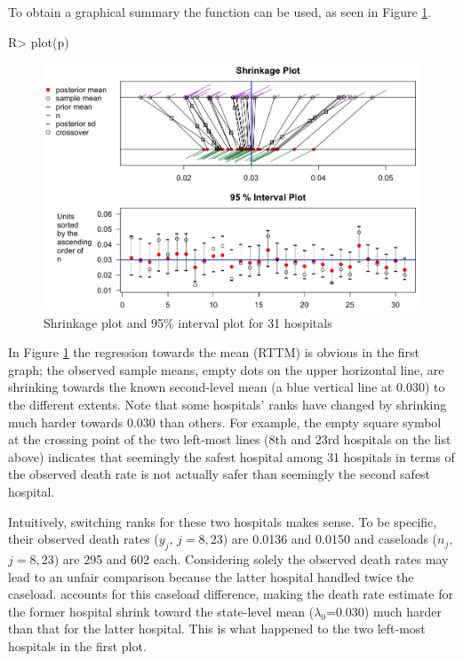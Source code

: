 \documentclass[article]{jss}
\begin{document}
To obtain a graphical summary the function  can be used, as seen in Figure \ref{fig:hospshr}.

\begin{CodeChunk}
\begin{CodeInput}
R> plot(p)
\end{CodeInput}
\end{CodeChunk}
\begin{figure}[h]
\begin{center}
\includegraphics[width = 6in]{hospital1.png}
\caption{Shrinkage plot and 95\% interval plot for 31 hospitals}
\label{fig:hospshr}
\end{center}
\end{figure}

In Figure \ref{fig:hospshr} the regression towards the mean (RTTM) is obvious in the first graph; the observed sample means, empty dots on the upper horizontal line, are shrinking towards the known second-level mean (a blue vertical line at 0.030) to the different extents. Note that some hospitals' ranks have changed by shrinking much harder towards 0.030 than others. For example, the empty square symbol at the crossing point of the two left-most lines (8th and 23rd hospitals on the list above) indicates that seemingly the safest hospital among 31 hospitals in terms of the observed death rate is not actually safer than seemingly the second safest hospital. 


Intuitively, switching ranks for these two hospitals makes sense. To be specific, their observed death rates ($y_{j}$, $j=8, 23$) are 0.0136 and 0.0150 and caseloads ($n_{j}$, $j=8, 23$) are 295 and 602 each. Considering solely the observed death rates may lead to an unfair comparison because the latter hospital handled twice the caseload.  accounts for this caseload difference, making the death rate estimate for the former hospital shrink toward the state-level mean ($\lambda_{0}$=0.030) much harder than that for the latter hospital. This is what happened to the two left-most hospitals in the first plot.
\end{document}
